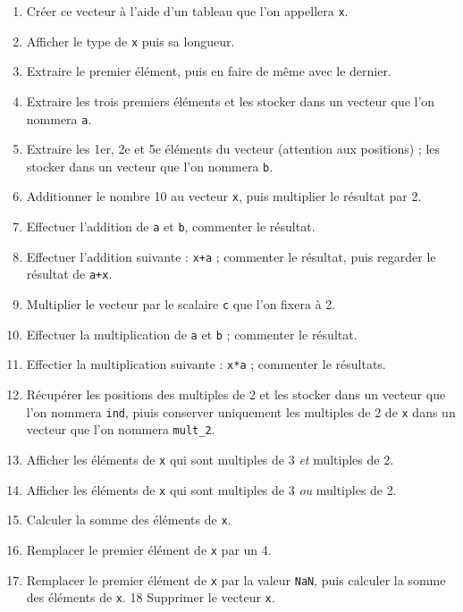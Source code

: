 \documentclass[12pt,]{book}
\providecommand{\tightlist}{%
  \setlength{\itemsep}{0pt}\setlength{\parskip}{0pt}}
\numberwithin{equation}{section}
\numberwithin{countremarque}{section}
\begin{document}
\begin{enumerate}
\def\labelenumi{\arabic{enumi}.}
\tightlist
\item
  Créer ce vecteur à l'aide d'un tableau que l'on appellera \texttt{x}.
\item
  Afficher le type de \texttt{x} puis sa longueur.
\item
  Extraire le premier élément, puis en faire de même avec le dernier.
\item
  Extraire les trois premiers éléments et les stocker dans un vecteur
  que l'on nommera \texttt{a}.
\item
  Extraire les 1er, 2e et 5e éléments du vecteur (attention aux
  positions) ; les stocker dans un vecteur que l'on nommera \texttt{b}.
\item
  Additionner le nombre 10 au vecteur \texttt{x}, puis multiplier le
  résultat par 2.
\item
  Effectuer l'addition de \texttt{a} et \texttt{b}, commenter le
  résultat.
\item
  Effectuer l'addition suivante : \texttt{x+a} ; commenter le résultat,
  puis regarder le résultat de \texttt{a+x}.
\item
  Multiplier le vecteur par le scalaire \texttt{c} que l'on fixera à 2.
\item
  Effectuer la multiplication de \texttt{a} et \texttt{b} ; commenter le
  résultat.
\item
  Effectier la multiplication suivante : \texttt{x*a} ; commenter le
  résultats.
\item
  Récupérer les positions des multiples de 2 et les stocker dans un
  vecteur que l'on nommera \texttt{ind}, piuis conserver uniquement les
  multiples de 2 de \texttt{x} dans un vecteur que l'on nommera
  \texttt{mult\_2}.
\item
  Afficher les éléments de \texttt{x} qui sont multiples de 3 \emph{et}
  multiples de 2.
\item
  Afficher les éléments de \texttt{x} qui sont multiples de 3 \emph{ou}
  multiples de 2.
\item
  Calculer la somme des éléments de \texttt{x}.
\item
  Remplacer le premier élément de \texttt{x} par un 4.
\item
  Remplacer le premier élément de \texttt{x} par la valeur \texttt{NaN},
  puis calculer la somme des éléments de \texttt{x}. 18 Supprimer le
  vecteur \texttt{x}.
\end{enumerate}
\end{document}
